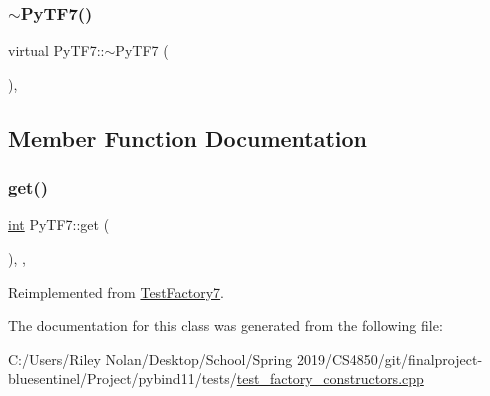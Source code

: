 \mbox{\label{class_py_t_f7_ab7ed843473a7f728ddb4c7eeb43e9f9e}} 
\subsubsection{\texorpdfstring{$\sim$PyTF7()}{~PyTF7()}}
{\footnotesize\ttfamily virtual Py\+T\+F7\+::$\sim$\+Py\+T\+F7 (\begin{DoxyParamCaption}{ }\end{DoxyParamCaption})\hspace{0.3cm}{\ttfamily [inline]}, {\ttfamily [virtual]}}



\subsection{Member Function Documentation}
\mbox{\label{class_py_t_f7_a064ae84a4d7c8bf5c8453aa96ad817b9}} 
\subsubsection{\texorpdfstring{get()}{get()}}
{\footnotesize\ttfamily \mbox{\hyperlink{warnings_8h_a74f207b5aa4ba51c3a2ad59b219a423b}{int}} Py\+T\+F7\+::get (\begin{DoxyParamCaption}{ }\end{DoxyParamCaption})\hspace{0.3cm}{\ttfamily [inline]}, {\ttfamily [override]}, {\ttfamily [virtual]}}



Reimplemented from \mbox{\hyperlink{class_test_factory7_a6ffd89e74c14c47aecd85ec468f5bfbb}{Test\+Factory7}}.



The documentation for this class was generated from the following file\+:\begin{DoxyCompactItemize}
\item 
C\+:/\+Users/\+Riley Nolan/\+Desktop/\+School/\+Spring 2019/\+C\+S4850/git/finalproject-\/bluesentinel/\+Project/pybind11/tests/\mbox{\hyperlink{test__factory__constructors_8cpp}{test\+\_\+factory\+\_\+constructors.\+cpp}}\end{DoxyCompactItemize}
